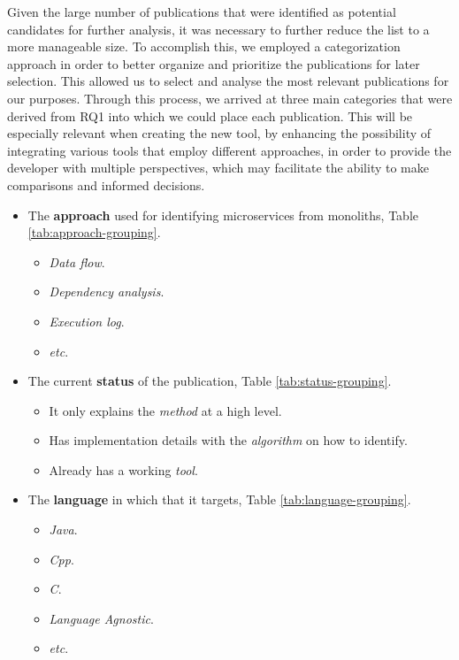 \documentclass[conference]{IEEEtran}
\begin{document}
Given the large number of publications that were identified as potential
candidates for further analysis, it was necessary to further reduce the list to
a more manageable size. To accomplish this, we employed a categorization
approach in order to better organize and prioritize the publications for later
selection. This allowed us to select and analyse the most relevant publications
for our purposes. Through this process, we arrived at three main categories
that were derived from RQ1 into which we could place each publication. This
will be especially relevant when creating the new tool, by enhancing the
possibility of integrating various tools that employ different approaches, in
order to provide the developer with multiple perspectives, which may facilitate
the ability to make comparisons and informed decisions.

\begin{itemize}
  \item The \textbf{approach} used for identifying microservices from
    monoliths, Table \ref{tab:approach-grouping}.
  \begin{itemize}
    \item \textit{Data flow}.
    \item \textit{Dependency analysis}.
    \item \textit{Execution log}.
    \item \textit{etc}.
  \end{itemize}
  \item The current \textbf{status} of the publication, Table
    \ref{tab:status-grouping}.
  \begin{itemize}
    \item It only explains the \textit{method} at a high level.
    \item Has implementation details with the \textit{algorithm} on how to
      identify.
    \item Already has a working \textit{tool}.
  \end{itemize}
  \item The \textbf{language} in which that it targets, Table
    \ref{tab:language-grouping}.
  \begin{itemize}
    \item \textit{Java}.
    \item \textit{Cpp}.
    \item \textit{C}.
    \item \textit{Language Agnostic}.
    \item \textit{etc}.
  \end{itemize}
\end{itemize}
\end{document}
